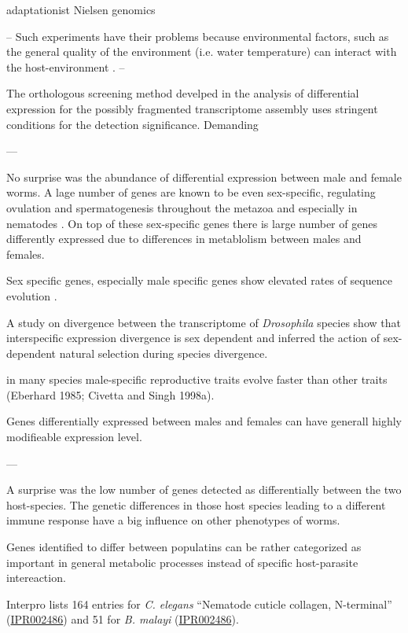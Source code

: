 adaptationist \cite{gould_spandrels_1979} Nielsen genomics
\cite{pmid19744124}


--
Such experiments have their problems because environmental factors,
such as the general quality of the environment (i.e. water
temperature) can interact with the host-environment
\cite{kaltz_shykoff_rev}.
--

The orthologous screening method develped in the analysis of
differential expression for the possibly fragmented transcriptome
assembly uses stringent conditions for the detection
significance. Demanding 

---

No surprise was the abundance of differential expression between male
and female worms. A lage number of genes are known to be even
sex-specific, regulating ovulation and spermatogenesis throughout the
metazoa \cite{pmid16825664} and especially in nematodes
\cite{pmid15987632}. On top of these sex-specific genes there is large
number of genes differently expressed due to differences in
metablolism between males and females.

Sex specific genes, especially male specific genes show elevated rates
of sequence evolution \cite{pmid11404480,pmid15371532}.

A study on divergence between the transcriptome of \textit{Drosophila}
species show that interspecific expression divergence is sex dependent
\cite{pmid19720861} and inferred the action of sex-dependent natural
selection during species divergence.

in many species male-specific reproductive traits evolve faster than
other traits (Eberhard 1985; Civetta and Singh 1998a).

Genes differentially expressed between males and females can have
generall highly modifieable expression level. 

---

A surprise was the low number of genes detected as differentially
between the two host-species. The genetic differences in those host
species leading to a different immune response have a big influence on
other phenotypes of worms.

Genes identified to differ between populatins can be rather
categorized as important in general metabolic processes instead of
specific host-parasite intereaction.



Interpro lists 164 entries for \textit{C. elegans} ``Nematode cuticle
collagen, N-terminal''
(\href{http://www.ebi.ac.uk/interpro/ISpy?ipr=IPR002486&tax=6239}{IPR002486})
and 51 for \textit{B. malayi}
(\href{http://www.ebi.ac.uk/interpro/ISpy?ipr=IPR002486&tax=6279}{IPR002486}).


